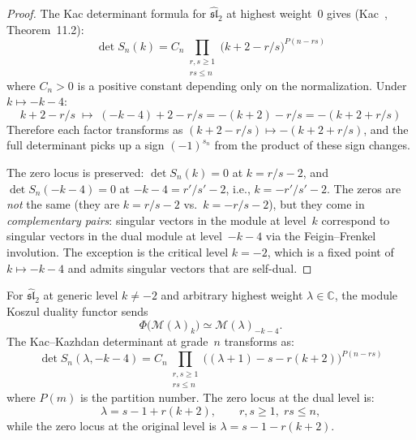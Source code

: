 \begin{proof}
The Kac determinant formula for $\widehat{\mathfrak{sl}}_2$ at
highest weight~$0$ gives
(Kac~\cite{Kac}, Theorem~11.2):
\begin{equation}\label{eq:kac-det-sl2}
\det S_n(k) = C_n \prod_{\substack{r,s \geq 1 \\ rs \leq n}}
\bigl(k + 2 - r/s\bigr)^{P(n-rs)}
\end{equation}
where $C_n > 0$ is a positive constant depending only on the
normalization.  Under $k \mapsto -k-4$:
\[
k + 2 - r/s \;\longmapsto\; (-k-4) + 2 - r/s
= -(k+2) - r/s = -(k + 2 + r/s)
\]
Therefore each factor transforms as
$(k+2-r/s) \mapsto -(k+2+r/s)$, and the full determinant picks
up a sign $(-1)^{s_n}$ from the product of these sign changes.

The zero locus is preserved: $\det S_n(k) = 0$ at $k = r/s - 2$,
and $\det S_n(-k-4) = 0$ at $-k-4 = r'/s' - 2$, i.e.,
$k = -r'/s' - 2$.  The zeros are \emph{not} the same (they are
$k = r/s - 2$ vs.\ $k = -r/s - 2$), but they come in
\emph{complementary pairs}: singular vectors in the module at
level~$k$ correspond to singular vectors in the dual module at
level~$-k-4$ via the Feigin--Frenkel involution.  The
exception is the critical level $k = -2$, which is a fixed point
of $k \mapsto -k-4$ and admits singular vectors that are
self-dual.
\end{proof}

\begin{proposition}
\label{prop:nonvacuum-verma-koszul}
For $\widehat{\mathfrak{sl}}_2$ at generic level $k \neq -2$ and
arbitrary highest weight $\lambda \in \mathbb{C}$, the module Koszul
duality functor sends
\begin{equation}\label{eq:nonvacuum-verma-koszul}
\Phi\bigl(\mathcal{M}(\lambda)_k\bigr) \simeq
\mathcal{M}(\lambda)_{-k-4}.
\end{equation}
The Kac--Kazhdan determinant at grade~$n$ transforms as:
\begin{equation}\label{eq:kk-general-transform}
\det S_n(\lambda, -k\!-\!4) = C_n
\prod_{\substack{r,s \geq 1 \\ rs \leq n}}
\bigl((\lambda+1) - s - r(k+2)\bigr)^{P(n-rs)}
\end{equation}
where $P(m)$ is the partition number.
The zero locus at the dual level is:
\begin{equation}\label{eq:dual-singular-locus}
\lambda = s - 1 + r(k+2), \qquad r,s \geq 1,\; rs \leq n,
\end{equation}
while the zero locus at the original level is $\lambda = s - 1 - r(k+2)$.
\end{proposition}

